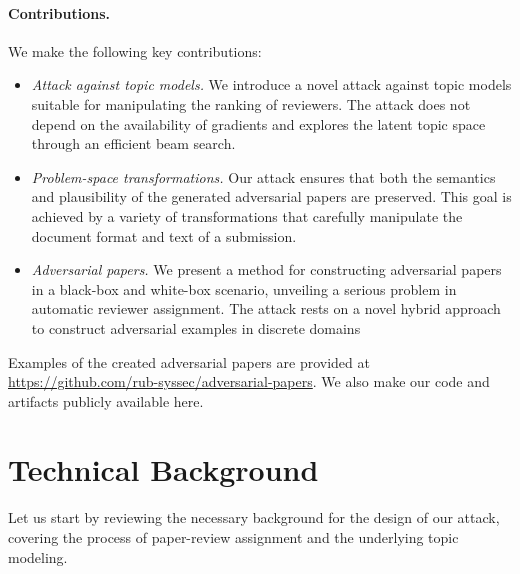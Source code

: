 \documentclass[letterpaper,twocolumn,10pt]{article}
\begin{document}
\paragraph{Contributions.}
We make the following key contributions:
\begin{itemize}[topsep=3pt, itemsep=3pt, partopsep=3pt, parsep=3pt]
\item \emph{Attack against topic models.}  We introduce a novel attack against topic models suitable for manipulating the ranking of reviewers. The attack does not depend on the availability of {gradients\EndAccSupp{}} and explores the latent topic space through an efficient beam search.
\item \emph{Problem-space transformations.} Our attack ensures that both the semantics and {plausibility\EndAccSupp{}} of the generated adversarial papers are preserved. This goal is achieved by a variety of transformations that carefully manipulate the document format and text of a submission.
\item \emph{Adversarial papers.} 
We present a method for constructing adversarial papers in a black-box and white-box scenario, unveiling a serious problem in automatic reviewer assignment. The attack rests on a novel {hybrid\EndAccSupp{}} approach to construct adversarial examples in {discrete\EndAccSupp{}} domains
\end{itemize}
Examples of the created adversarial papers are provided at \href{https://github.com/rub-syssec/adversarial-papers}{https://github.com/rub-syssec/adversarial-papers}. We also make our code and artifacts publicly available here.
 \section{Technical Background}
\label{sec:background}

Let us start by reviewing the necessary background for the design of our attack, covering the process of paper-review assignment and the underlying topic modeling. 
\end{document}
